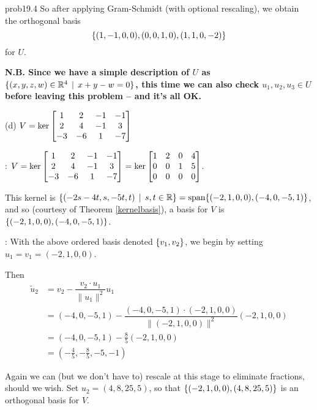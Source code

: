 \begin{sol}{prob19.4}
So after applying Gram-Schmidt (with optional rescaling), we obtain the orthogonal basis $$\{(1, -1, 0, 0),(0,0,1,0),(1,1,0,-2) \}$$ for $U$.

{\bf N.B. Since we have a simple description of $U$ as $\{(x,y,z, w)\in\mathbb{R}^4 \,\mid \, x+y-w=0 \}$, this time we can also check $u_1, u_2, u_3 \in U$ before leaving this problem -- and it's all OK.}
\medskip

(d) $V=\ker \bmatrix 1 & 2 & -1 & -1 \\
 2 & 4 & -1 & 3 \\
 -3 & -6 & 1 & -7 \endbmatrix$

\soln {}: $V=\ker \bmatrix 1 & 2 & -1 & -1 \\
 2 & 4 & -1 & 3 \\
 -3 & -6 & 1 & -7 \endbmatrix=\ker
\bmatrix 
1 & 2 & 0 & 4 \\
 0 & 0 & 1 & 5 \\
 0 & 0 & 0 & 0 \\ \endbmatrix$. 

This kernel is $\{(-2s-4t,s,-5t,t)\,\mid \, s,t \in \mathbb{R}  \}=\textrm{span}\{(-2,1,0,0),(-4,0,-5,1)\} $, and so (courtesy of Theorem \ref{kernelbasis}), a basis for $V$ is $\{(-2,1,0,0),(-4,0,-5,1) \}$.

: With the above ordered basis denoted $\{v_1, v_2 \}$, we begin by setting $u_1=v_1=(-2,1,0,0)$. 

Then 
\begin{equation*}
\begin{split}
 \tilde u_2 &= v_2 -\dfrac{v_2\cdot u_1}{\| u_1\|^2}u_1\\
  &= (-4,0,-5,1)-\dfrac{(-4,0,-5,1)\cdot (-2,1,0,0)}{\| (-2,1,0,0)\|^2}(-2,1,0,0)\\
  &=(-4,0,-5,1)-\frac85(-2,1,0,0) \\
  &= (-\frac45,-\frac85, -5, -1 )
\end{split}\end{equation*}

Again we can (but we don't have to) rescale at this stage to eliminate fractions, should we wish. Set $u_2=(4, 8, 25,5)$, so that $\{(-2,1,0,0),(4, 8, 25,5) \}$ is an orthogonal basis for $V$.
  
\medskip
%

\end{sol}

